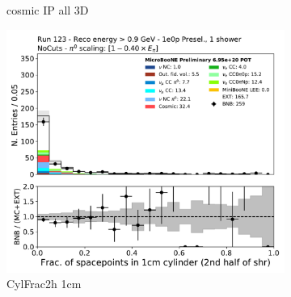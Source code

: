 \begin{figure}[H]
\begin{subfigure}{0.3\textwidth}
    \caption{cosmic IP all 3D}
    \end{subfigure}
    \begin{subfigure}{0.3\textwidth}
    \includegraphics[width=1.0\textwidth]{1e0p/High_E_Sideband/CylFrac2h_1cm.pdf}
    \caption{CylFrac2h 1cm}
    \end{subfigure}
    \caption{} 
    \label{fig:HE_1eNp_1}
\end{figure}

